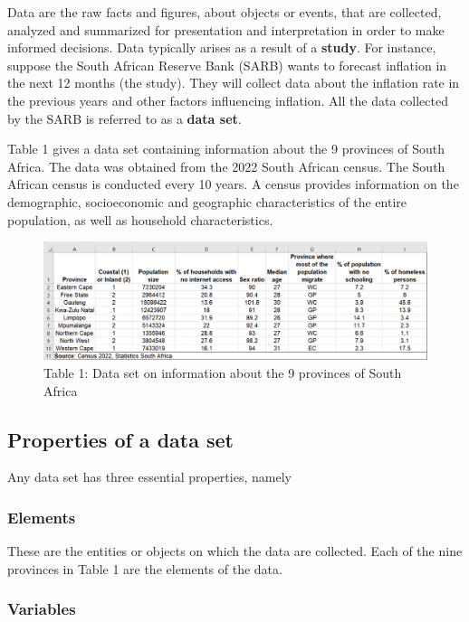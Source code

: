 \documentclass[
]{book}
\begin{document}
Data are the raw facts and figures, about objects or events, that are collected, analyzed and summarized for presentation and interpretation in order to make informed decisions. Data typically arises as a result of a \textbf{study}. For instance, suppose the South African Reserve Bank (SARB) wants to forecast inflation in the next 12 months (the study). They will collect data about the inflation rate in the previous years and other factors influencing inflation. All the data collected by the SARB is referred to as a \textbf{data set}.

Table 1 gives a data set containing information about the 9 provinces of South Africa. The data was obtained from the 2022 South African census. The South African census is conducted every 10 years. A census provides information on the demographic, socioeconomic and geographic characteristics of the entire population, as well as household characteristics.

\begin{figure}
\centering
\includegraphics{images/clipboard-533064056.png}
\caption{Table 1: Data set on information about the 9 provinces of South Africa}
\end{figure}

\subsection{Properties of a data set}\label{properties-of-a-data-set}

Any data set has three essential properties, namely

\subsubsection{Elements}\label{elements}

These are the entities or objects on which the data are collected. Each of the nine provinces in Table 1 are the elements of the data.

\subsubsection{Variables}\label{variables}
\end{document}
